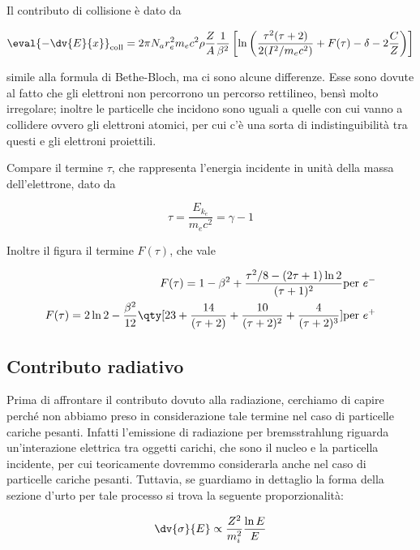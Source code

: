 Il contributo di collisione è dato da

\begin{equation*}
    \eval{-\dv{E}{x}}_{\rm coll}
    =2 \pi N_a r_e^2 m_e c^2 \rho \frac{Z}{A} \frac{1}{\beta^2} \left[\ln{\left(\frac{\tau^2 (\tau + 2)}{2(I^2/m_e c^2)} + F(\tau) - \delta - 2 \frac{C}{Z}\right)}\right]
\end{equation*}

\E simile alla formula di Bethe-Bloch, ma ci sono alcune differenze. Esse sono dovute al fatto che gli elettroni non percorrono un percorso rettilineo, bensì molto irregolare; inoltre le particelle che incidono sono uguali a quelle con cui vanno a collidere ovvero gli elettroni atomici, per cui c'è una sorta di indistinguibilità tra questi e gli elettroni proiettili.

Compare il termine $\tau$, che rappresenta l'energia incidente in unità della massa dell'elettrone, dato da

\begin{equation*}
    \tau=\frac{E_{k_e}}{m_e c^2}=\gamma - 1
\end{equation*}

Inoltre il figura il termine $F(\tau)$, che vale

\begin{eqnarray*}
    F(\tau)=1 - \beta^2 + \frac{\tau^2/8 - (2\tau + 1)\ln{2}}{(\tau + 1)^2} & \text{per } e^-
    \\
    F(\tau)=2\ln{2} - \frac{\beta^2}{12} \qty[ 23 + \frac{14}{(\tau + 2)} + \frac{10}{(\tau + 2)^2} + \frac{4}{(\tau + 2)^3} ] & \text{per } e^+
\end{eqnarray*}

\subsection{Contributo radiativo}

Prima di affrontare il contributo dovuto alla radiazione, cerchiamo di capire perché non abbiamo preso in considerazione tale termine nel caso di particelle cariche pesanti. Infatti l'emissione di radiazione per bremsstrahlung riguarda un'interazione elettrica tra oggetti carichi, che sono il nucleo e la particella incidente, per cui teoricamente dovremmo considerarla anche nel caso di particelle cariche pesanti. Tuttavia, se guardiamo in dettaglio la forma della sezione d'urto per tale processo si trova la seguente proporzionalità:

\begin{equation*}
    \dv{\sigma}{E} \propto \frac{Z^2}{m_i^2} \frac{\ln{E}}{E}
\end{equation*}

